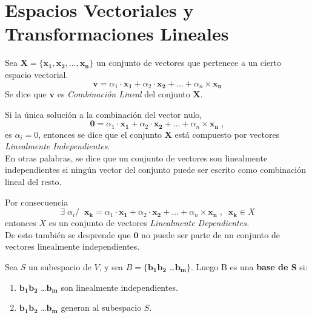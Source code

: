 \section{Espacios Vectoriales y Transformaciones Lineales}
\begin{definition}
    Sea $ \bm{X} = \{ \bm{x_1, x_2} ,\dots, \bm{x_n} \}$ un conjunto de 
    vectores que pertenece a un cierto espacio vectorial.
    \begin{equation*}
        \bm{v} = \alpha_1 \cdot \bm{x_1} + \alpha_2 \cdot \bm{x_2} + \dots + \alpha_n \times \bm{x_n}    
    \end{equation*}
    Se dice que $\bm{v}$ es \textit{Combinación Lineal} del conjunto $\bm{X}$.
\end{definition}
\begin{definition}
    Si la única solución a la combinación del vector nulo,
    \begin{equation*}
        \bm{0} = \alpha_1 \cdot \bm{x_1} + \alpha_2 \cdot \bm{x_2} + \dots + \alpha_n \times \bm{x_n} \;,
    \end{equation*}
    es $\alpha_i = 0$, entonces se dice que el conjunto $\bm{X}$ está compuesto
    por vectores \textit{Linealmente Independientes}.\\
    En otras palabras, se dice que un conjunto de vectores son linealmente independientes si ningún vector del conjunto
    puede ser escrito como combinación lineal del resto.
\end{definition}
\begin{obs}
    Por consecuencia
    \begin{equation*}
       \exists \; \alpha_i / \;\; \bm{x_k} = \alpha_1 \cdot \bm{x_1} + \alpha_2 \cdot \bm{x_2} + \dots + \alpha_n \times \bm{x_n}\; , \;\; \bm{x_k} \in X   
    \end{equation*}
    entonces $X$ es un conjunto de vectores \textit{Linealmente Dependientes.}\\
    De esto también se desprende que $\bm{0}$ no puede ser parte de un conjunto
    de vectores linealmente independientes.
\end{obs} 

\begin{definition}
    Sea $S$ un subespacio de $V$, y sea $B = \{ \bm{b_1 b_2} $ \dots $\bm{b_m} \}$.
    Luego B es una \textbf{base de S} si:
    \begin{enumerate}
        \item $\bm{b_1 b_2}$ \dots $\bm{b_m}$ son linealmente independientes.
        \item $\bm{b_1 b_2}$ \dots $\bm{b_m}$ generan al subespacio $S$.
    \end{enumerate}
\end{definition}

